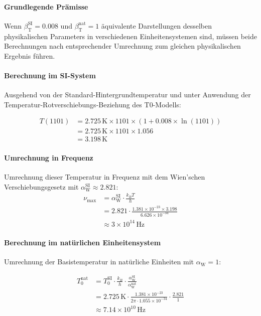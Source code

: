 \documentclass[12pt,a4paper]{article}
\newcommand{\betaT}{\beta_{\text{T}}}
\newcommand{\alphaW}{\alpha_{\text{W}}}
\begin{document}
	\paragraph{Grundlegende Prämisse}
	Wenn \(\betaT^{\text{SI}} = 0.008\) und \(\betaT^{\text{nat}} = 1\) äquivalente Darstellungen desselben physikalischen Parameters in verschiedenen Einheitensystemen sind, müssen beide Berechnungen nach entsprechender Umrechnung zum gleichen physikalischen Ergebnis führen.
	
	\paragraph{Berechnung im SI-System}
	Ausgehend von der Standard-Hintergrundtemperatur und unter Anwendung der Temperatur-Rotverschiebungs-Beziehung des T0-Modells:
	
	\begin{align}
		T(1101) &= 2.725 \, \text{K} \times 1101 \times (1 + 0.008 \times \ln(1101)) \\
		&= 2.725 \, \text{K} \times 1101 \times 1.056 \\
		&= 3.198 \, \text{K}
	\end{align}
	
	\paragraph{Umrechnung in Frequenz}
	Umrechnung dieser Temperatur in Frequenz mit dem Wien'schen Verschiebungsgesetz mit \(\alphaW^{\text{SI}} \approx 2.821\):
	\begin{align}
		\nu_{\text{max}} &= \alphaW^{\text{SI}} \cdot \frac{k_B T}{h} \\
		&= 2.821 \cdot \frac{1.381 \times 10^{-23} \times 3.198}{6.626 \times 10^{-34}} \\
		&\approx 3 \times 10^{14} \, \text{Hz}
	\end{align}
	
	\paragraph{Berechnung im natürlichen Einheitensystem}
	Umrechnung der Basistemperatur in natürliche Einheiten mit \(\alphaW = 1\):
	
	\begin{align}
		T_0^{\text{nat}} &= T_0^{\text{SI}} \cdot \frac{k_B}{h} \cdot \frac{\alphaW^{\text{SI}}}{\alphaW^{\text{nat}}} \\
		&= 2.725 \, \text{K} \cdot \frac{1.381 \times 10^{-23}}{2\pi \cdot 1.055 \times 10^{-34}} \cdot \frac{2.821}{1} \\
		&\approx 7.14 \times 10^{10} \, \text{Hz}
	\end{align}
	
\end{document}
